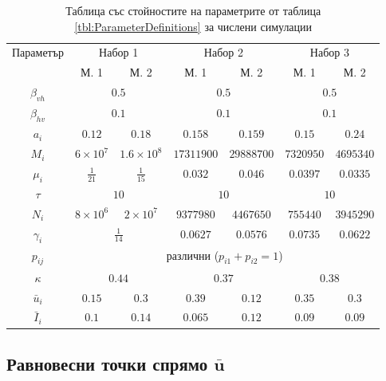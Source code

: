 \begin{table}[H]
  \centering
  \begin{tabular}{ |c ||c c c c c c|  }
    \hline
    \multirow{2}{*}{Параметър}& \multicolumn{2}{c}{Набор 1}& \multicolumn{2}{c}{Набор 2} & \multicolumn{2}{c|}{Набор 3}\\
    & М. 1 & М. 2 & М. 1 & М. 2 & М. 1 & М. 2\\
    \hline
    $\beta_{vh}$ & \multicolumn{2}{c}{$0.5$} & \multicolumn{2}{c}{$0.5$}  & \multicolumn{2}{c|}{$0.5$}\\
    $\beta_{hv}$ & \multicolumn{2}{c}{$0.1$} & \multicolumn{2}{c}{$0.1$} & \multicolumn{2}{c|}{$0.1$}\\
    $a_i$ & $0.12$ & $0.18$ & $0.158$ & $0.159$ & $0.15$ & $0.24$\\
    $M_i$ & $6 \times 10^7$ & $1.6 \times 10^8$ & $17311900$ & $29888700$ & $7320950$ & $4695340$\\
    $\mu_i$ & $\frac{1}{21}$ & $\frac{1}{15}$ & $0.032$ & $0.046$ & $0.0397$ & $0.0335$\\
    $\tau$ & \multicolumn{2}{c}{$10$} & \multicolumn{2}{c}{$10$} & \multicolumn{2}{c|}{$10$}\\
    $N_i$ & $8 \times 10^6$ & $2 \times 10^7$ & $9377980$ & $4467650$ & $755440$ & $3945290$\\
    $\gamma_i$ & \multicolumn{2}{c}{$\frac{1}{14}$} & $0.0627$ & $0.0576$ & $0.0735$ & $0.0622$\\
    $p_{ij}$ & \multicolumn{6}{c|}{различни ($p_{i1}+p_{i2}=1$)}\\
    $\kappa$ & \multicolumn{2}{c}{$0.44$} & \multicolumn{2}{c}{$0.37$} & \multicolumn{2}{c|}{$0.38$}\\
    $\bar{u}_i$ & $0.15$ & $0.3$ & $0.39$ & $0.12$ & $0.35$ & $0.3$\\
    $\bar{I}_i$ & $0.1$ & $0.14$ & $0.065$ & $0.12$ & $0.09$ & $0.09$\\
    \hline
  \end{tabular}
  \caption{Таблица със стойностите на параметрите от таблица \ref{tbl:ParameterDefinitions} за числени симулации}
  \label{tbl:ParameterValues}
\end{table}

\subsection{Равновесни точки спрямо $\bar{\mathbf{u}}$}

